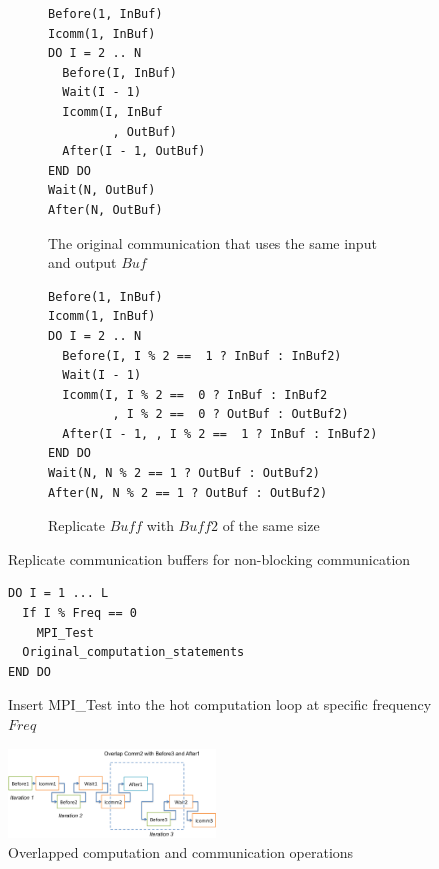 \begin{figure}
{\scriptsize
  \centering
  \begin{subfigure}[b]{.20\textwidth}
\begin{verbatim}
Before(1, InBuf)
Icomm(1, InBuf)
DO I = 2 .. N
  Before(I, InBuf)
  Wait(I - 1)
  Icomm(I, InBuf
         , OutBuf)
  After(I - 1, OutBuf)
END DO
Wait(N, OutBuf)
After(N, OutBuf)
\end{verbatim}
    \caption{The original communication that uses the same input and output $Buf$}
    \label{fig:cco:dup:a}
  \end{subfigure}%
  \hspace{.01in}
  \begin{subfigure}[b]{.28\textwidth}
\begin{verbatim}
Before(1, InBuf)
Icomm(1, InBuf)
DO I = 2 .. N
  Before(I, I % 2 ==  1 ? InBuf : InBuf2)
  Wait(I - 1)
  Icomm(I, I % 2 ==  0 ? InBuf : InBuf2
         , I % 2 ==  0 ? OutBuf : OutBuf2)
  After(I - 1, , I % 2 ==  1 ? InBuf : InBuf2)
END DO
Wait(N, N % 2 == 1 ? OutBuf : OutBuf2)
After(N, N % 2 == 1 ? OutBuf : OutBuf2)
\end{verbatim}
    \caption{Replicate $Buff$ with $Buff2$ of the same size}
    \label{fig:cco:dup:b}
  \end{subfigure}
\caption{Replicate communication buffers for non-blocking communication}
\label{fig:cco:dup}
}%
\end{figure}

\begin{figure}[h]
{\scriptsize
\begin{verbatim}
DO I = 1 ... L
  If I % Freq == 0
    MPI_Test
  Original_computation_statements
END DO
\end{verbatim}
}%
\caption{Insert MPI\_Test into the hot computation loop at specific frequency $Freq$}
\label{fig:cco:test}
\end{figure}

\begin{figure}[h]
\centering
\includegraphics[width=0.49\textwidth]{fig/ft_shift.png} %
\caption{Overlapped computation and communication operations}
\label{fig:cco:shift}
\end{figure}

